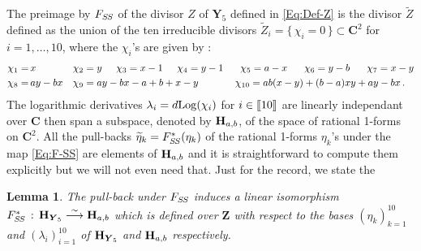\documentclass[11pt]{amsart}
\newtheorem{lem}[thm]{Lemma}
\begin{document}
The preimage by $F_{S\hspace{-0.03cm}S}$ of the divisor $Z$ of $\boldsymbol{Y}_5$ defined in \eqref{Eq:Def-Z} is the divisor 
$\widetilde Z$ defined as the union of the ten irreducible divisors 
 $\widetilde Z_i=\{ \, \chi_i=0\, \}\subset \mathbf C^2$ for $i=1,\ldots,10$, where the $\chi_i$'s are given by : 
\begin{align*}
\chi_1=&\, x && \chi_2= y   \hspace{0.5cm} \chi_3=x-1 \hspace{0.5cm} \chi_4=y -1
\hspace{0.6cm}
 \chi_5= a -x
\hspace{0.6cm}
\chi_6= y-b  
\hspace{0.6cm}
  \chi_7= x-y
\\
  \chi_8=&\,  a y -b x
&& \chi_9= a y -b x -a +b +x -y 
\hspace{1.3cm}
 \chi_{10}=
 ab(x-y)+(b-a)xy+ay-bx
\, . 
\end{align*}
The 
logarithmic derivatives $\lambda_i=d {\rm Log}( \chi_i)$ for $i\in [\hspace{-0.05cm}[ 10  ]\hspace{-0.05cm}]$ are linearly independant over $\mathbf C$ then span 
a subspace, denoted by  ${\bf H}_{a,b}$, of the space of rational 1-forms on $\mathbf C^2$.
 All the pull-backs $\widetilde \eta_k=F_{S\hspace{-0.03cm}S}^*(\eta_k)$ of the rational 1-forms $\eta_k$'s under the map \eqref{Eq:F-SS} are elements of ${\bf H}_{a,b}$ and it is straightforward to compute them explicitly but we will not even need that. Just for the record, we state the 
 \begin{lem}
 The pull-back under $F_{S\hspace{-0.03cm}S}$ induces a linear isomorphism 
$F_{S\hspace{-0.03cm}S}^* \, : \, 
 {\bf H}_{\boldsymbol{Y}_5} 
 \stackrel{\sim}{\longrightarrow}
{\bf H}_{a,b} $ 
which is defined over $\mathbf Z$ with respect to the bases $(\eta_k)_{k=1}^{10}$ and $(\lambda_i)_{i=1}^{10}$ of  ${\bf H}_{\boldsymbol{Y}_5} $ and 
$
{\bf H}_{a,b} $ respectively. 
 \end{lem}
 
\end{document}
